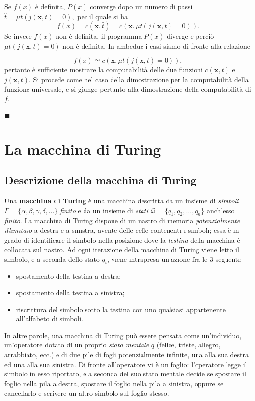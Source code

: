\documentclass[10pt]{\classname}
\theoremstyle{newlinethm}
\theoremstyle{theorem}
\theoremstyle{definition}
\theoremstyle{definition}
\theoremstyle{definition}
\theoremstyle{definition}
\begin{document}
Se $f(x)$ è definita, $P(x)$ converge dopo un numero di passi $\hat t = \mu t \left(j(\bm{x}, t) = 0\right),$ per il quale si ha
\[f(x) = c(\bm{x}, \hat t) = c(\bm{x}, \mu t \left(j(\bm{x}, t) = 0\right)).\] Se invece $f(x)$ non è definita, il programma $P(x)$ diverge e perciò $\mu t \left(j(\bm{x}, t) = 0\right)$ non è definita. In ambedue i casi siamo di fronte alla relazione

\[f(x) \simeq c(\bm{x}, \mu t \left(j(\bm{x}, t) = 0\right)),\] pertanto è sufficiente mostrare la computabilità delle due funzioni $c(\bm{x}, t)$ e $j(\bm x, t)$. Si procede come nel caso della dimostrazione per la computabilità della funzione universale, e si giunge pertanto alla dimostrazione della computabilità di $f$.

\begin{flushright}
$\blacksquare$
\end{flushright}

\chapter{La macchina di Turing}

\section{Descrizione della macchina di Turing}

Una \textbf{macchina di Turing} è una macchina descritta da un insieme di
\emph{simboli} $\Gamma = \{\alpha, \beta, \gamma, \delta, \dots\}$ \emph{finito} e da
un insieme di \emph{stati} $\mathcal{Q} = \{q_1, q_2, \dots, q_n\}$ anch'esso
\emph{finito}. La macchina di Turing dispone di un nastro di memoria
\emph{potenzialmente illimitato} a destra e a sinistra, avente delle celle
contenenti i simboli; essa è in grado di identificare il simbolo nella posizione dove la
\emph{testina} della macchina è collocata sul nastro. Ad ogni iterazione della
macchina di Turing viene letto il simbolo, e a seconda dello stato $q_i$, viene
intrapresa un'azione fra le $3$ seguenti:
\begin{itemize}
    \item spostamento della testina a destra;
    \item spostamento della testina a sinistra;
    \item riscrittura del simbolo sotto la testina con uno qualsiasi
        appartenente all'alfabeto di simboli.
\end{itemize}

In altre parole, una macchina di Turing può essere pensata come un'individuo, un'operatore dotato di un proprio \emph{stato mentale} $q$ (felice, triste, allegro, arrabbiato, ecc.) e di due pile di fogli potenzialmente infinite, una alla sua destra ed una alla sua sinistra. Di fronte all'operatore vi è un foglio: l'operatore legge il simbolo in esso riportato, e a seconda del suo stato mentale decide se spostare il foglio nella pila a destra, spostare il foglio nella pila a sinistra, oppure se cancellarlo e scrivere un altro simbolo sul foglio stesso.
\end{document}

